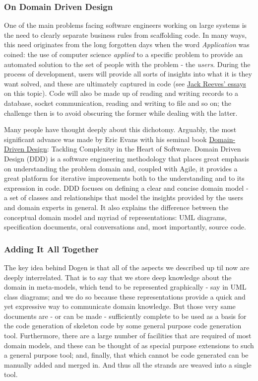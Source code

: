 \documentclass[11pt]{article}
\begin{document}
\subsubsection{On Domain Driven Design}
\label{sec-2-1-4}

One of the main problems facing software engineers working on large
systems is the need to clearly separate business rules from
scaffolding code. In many ways, this need originates from the long
forgotten days when the word \emph{Application} was coined: the use of
computer science \emph{applied} to a specific problem to provide an
automated solution to the set of people with the problem - the
\emph{users}. During the process of development, users will provide all
sorts of insights into what it is they want solved, and these are
ultimately captured in code (see \href{http://www.developerdotstar.com/mag/articles/PDF/DevDotStar_Reeves_CodeAsDesign.pdf}{Jack Reeves' essays} on this
topic). Code will also be made up of reading and writing records to a
database, socket communication, reading and writing to file and so on;
the challenge then is to avoid obscuring the former while dealing with
the latter.

Many people have thought deeply about this dichotomy. Arguably, the
most significant advance was made by Eric Evans with his seminal book
\href{http://www.amazon.co.uk/Domain-driven-Design-Tackling-Complexity-Software/dp/0321125215}{Domain-Driven Design}: Tackling Complexity in the Heart of
Software. Domain Driven Design (DDD) is a software engineering
methodology that places great emphasis on understanding the problem
domain and, coupled with Agile, it provides a great platform for
iterative improvements both to the understanding and to its expression
in code. DDD focuses on defining a clear and concise domain model - a
set of classes and relationships that model the insights provided by
the users and domain experts in general. It also explains the
difference between the conceptual domain model and myriad of
representations: UML diagrams, specification documents, oral
conversations and, most importantly, source code.

\subsubsection{Adding It All Together}
\label{sec-2-1-5}

The key idea behind Dogen is that all of the aspects we described up
til now are deeply interrelated. That is to say that we store deep
knowledge about the domain in meta-models, which tend to be
represented graphically - say in UML class diagrams; and we do so
because these representations provide a quick and yet expressive way
to communicate domain knowledge. But those very same documents are -
or can be made - sufficiently complete to be used as a basis for the
code generation of skeleton code by some general purpose code
generation tool. Furthermore, there are a large number of facilities
that are required of most domain models, and these can be thought of
as special purpose extensions to such a general purpose tool; and,
finally, that which cannot be code generated can be manually added and
merged in. And thus all the strands are weaved into a single tool.
\end{document}
